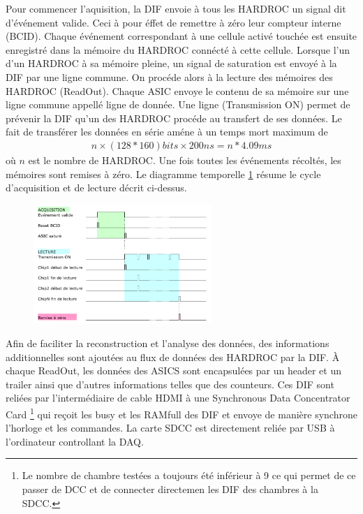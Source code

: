 Pour commencer l'aquisition, la DIF envoie à tous les HARDROC un signal dit d'événement valide. Ceci à pour éffet de remettre à zéro leur compteur interne (BCID). Chaque événement correspondant à une cellule activé touchée est ensuite enregistré dans la mémoire du HARDROC connécté à cette cellule. Lorsque l'un d'un HARDROC à sa mémoire pleine, un signal de saturation est envoyé à la DIF par une ligne commune. On procéde alors à la lecture des mémoires des HARDROC (ReadOut). Chaque ASIC envoye le contenu de sa mémoire sur une ligne commune appellé ligne de donnée. Une ligne (Transmission ON) permet de prévenir la DIF qu'un des HARDROC procéde au transfert de ses données. Le fait de transférer les données en série améne à un temps mort maximum de
\begin{eqnarray}
n\times(128*160)bits\times 200ns= n*4.09ms
\end{eqnarray} 
où $n$ est le nombre de HARDROC. Une fois toutes les événements récoltés, les mémoires sont remises à zéro. Le diagramme temporelle \ref{temp} résume le cycle d'acquisition et de lecture décrit ci-dessus.

\begin{figure}[h!]
	\centering
	\includegraphics[width=0.6\textwidth]{GLA/cycle.png}
	\label{temp}
\end{figure}
Afin de faciliter la reconstruction et l'analyse des données, des informations additionnelles sont ajoutées au flux de données des HARDROC par la DIF. À chaque ReadOut, les données des ASICS sont encapsulées par un header et un trailer ainsi que d'autres informations telles que des counteurs. Ces DIF sont reliées par l'intermédiaire de cable HDMI à une Synchronous Data Concentrator Card \footnote{Le nombre de chambre testées a toujours été inférieur à 9 ce qui permet de ce passer de DCC et de connecter directemen les DIF des chambres à la SDCC.} \cite{Baulieu:2015pfa} qui reçoit les busy et les RAMfull des DIF et envoye de manière synchrone l'horloge et les commandes. La carte SDCC est directement reliée par USB à l'ordinateur controllant la DAQ.

